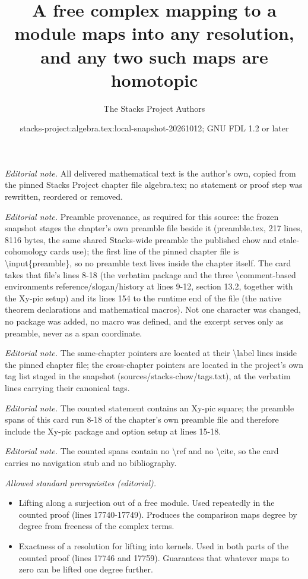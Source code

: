 \documentclass[10pt,a4paper]{amsart}
\title{A free complex mapping to a module maps into any resolution, and any two such maps are homotopic}
\author{The Stacks Project Authors}
\date{stacks-project:algebra.tex:local-snapshot-20261012; GNU FDL 1.2 or later}
\theoremstyle{plain}
\theoremstyle{definition}
\theoremstyle{remark}
\numberwithin{equation}{subsection}
\begin{document}
\maketitle
\noindent\textit{Editorial note.} All delivered mathematical text is the author's own, copied from the pinned Stacks Project chapter file algebra.tex; no statement or proof step was rewritten, reordered or removed.\par\medskip
\noindent\textit{Editorial note.} Preamble provenance, as required for this source: the frozen snapshot stages the chapter's own preamble file beside it (preamble.tex, 217 lines, 8116 bytes, the same shared Stacks-wide preamble the published chow and etale-cohomology cards use); the first line of the pinned chapter file is \textbackslash{}input\{preamble\}, so no preamble text lives inside the chapter itself. The card takes that file's lines 8-18 (the verbatim package and the three \textbackslash{}comment-based environments reference/slogan/history at lines 9-12, section 13.2, together with the Xy-pic setup) and its lines 154 to the runtime end of the file (the native theorem declarations and mathematical macros). Not one character was changed, no package was added, no macro was defined, and the excerpt serves only as preamble, never as a span coordinate.\par\medskip
\noindent\textit{Editorial note.} The same-chapter pointers are located at their \textbackslash{}label lines inside the pinned chapter file; the cross-chapter pointers are located in the project's own tag list staged in the snapshot (sources/stacks-chow/tags.txt), at the verbatim lines carrying their canonical tags.\par\medskip
\noindent\textit{Editorial note.} The counted statement contains an Xy-pic square; the preamble spans of this card run 8-18 of the chapter's own preamble file and therefore include the Xy-pic package and option setup at lines 15-18.\par\medskip
\noindent\textit{Editorial note.} The counted spans contain no \textbackslash{}ref and no \textbackslash{}cite, so the card carries no navigation stub and no bibliography.\par\medskip
\noindent\textit{Allowed standard prerequisites (editorial).}\begin{itemize}
\item Lifting along a surjection out of a free module. Used repeatedly in the counted proof (lines 17740-17749). Produces the comparison maps degree by degree from freeness of the complex terms.
\item Exactness of a resolution for lifting into kernels. Used in both parts of the counted proof (lines 17746 and 17759). Guarantees that whatever maps to zero can be lifted one degree further.
\end{itemize}\medskip
\end{document}
